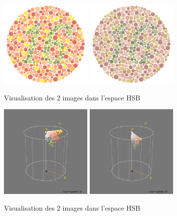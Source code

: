 \documentclass[a4paper]{article}
\begin{document}
\begin{figure}[H]
\begin{center}
\includegraphics[width=170px]{../base/cas_2_dalton16.png}
\includegraphics[width=170px]{../base/cas_2_dalton16-question2-1.png}
\end{center}
\caption{Visualisation des 2 images dans l'espace HSB}
\end{figure}

\begin{figure}[H]
\begin{center}
\includegraphics[width=170px]{../resultats/e2_q1_k2_16.png}
\includegraphics[width=170px]{../resultats/e2_q1_k2_modif.png}
\end{center}
\caption{Visualisation des 2 images dans l'espace HSB}
\end{figure}
\end{document}
